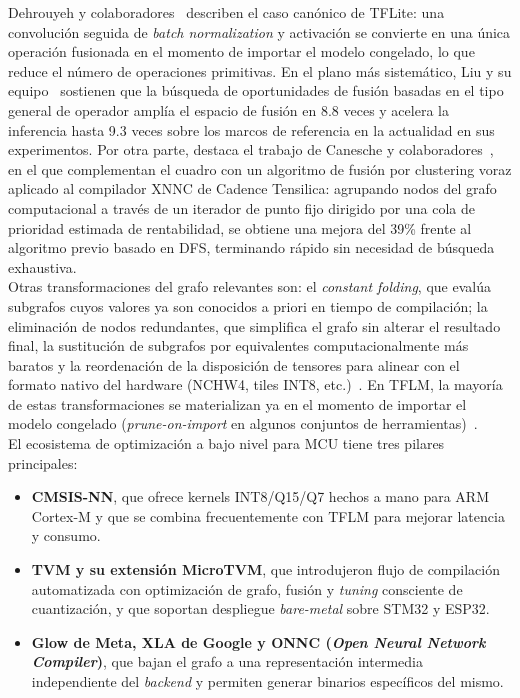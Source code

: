 \documentclass[a4paper,12pt,twoside,final]{book}
\begin{document}
Dehrouyeh y colaboradores~\cite{dehrouyeh2024ieeeaccess} describen el caso canónico de TFLite: una convolución
seguida de \textit{batch normalization} y activación se convierte en una única operación fusionada en el momento de
importar el modelo congelado, lo que reduce el número de operaciones primitivas. En el plano más sistemático,
Liu y su equipo~\cite{liu2023ieecomst} sostienen que la búsqueda de oportunidades de fusión basadas en el
tipo general de operador amplía el espacio de fusión en 8.8 veces y acelera la inferencia hasta 9.3 veces sobre los
marcos de referencia en la actualidad en sus experimentos. Por otra parte, destaca el trabajo de Canesche y
colaboradores~\cite{canesche2021acm}, en el que complementan el cuadro con un algoritmo de fusión por clustering
voraz aplicado al compilador XNNC de Cadence Tensilica: agrupando nodos del grafo computacional a través de un
iterador de punto fijo dirigido por una cola de prioridad estimada de rentabilidad, se obtiene una mejora del 39\%
frente al algoritmo previo basado en DFS, terminando rápido sin necesidad de búsqueda exhaustiva.\\

Otras transformaciones del grafo relevantes son: el \textit{constant folding}, que evalúa subgrafos cuyos valores ya
son conocidos a priori en tiempo de compilación; la eliminación de nodos redundantes, que simplifica el grafo sin
alterar el resultado final, la sustitución de subgrafos por equivalentes computacionalmente más baratos y la
reordenación de la disposición de tensores para alinear con el formato nativo del hardware
(NCHW4, tiles INT8, etc.)~\cite{somvanshi2025acm,zheng2025diffusion}. En TFLM, la mayoría de estas transformaciones
se materializan ya en el momento de importar el modelo congelado (\textit{prune-on-import} en algunos conjuntos de
herramientas)~\cite{somvanshi2025acm,dehrouyeh2024ieeeaccess}.\\

El ecosistema de optimización a bajo nivel para MCU tiene tres pilares principales:
\begin{itemize}
  \item \textbf{CMSIS-NN}, que ofrece kernels INT8/Q15/Q7 hechos a mano para ARM Cortex-M y que se combina
  frecuentemente con TFLM para mejorar latencia y consumo.
  \item \textbf{TVM y su extensión MicroTVM}, que introdujeron flujo de compilación automatizada con optimización de
  grafo, fusión y \textit{tuning} consciente de cuantización, y que soportan despliegue \textit{bare-metal} sobre STM32
  y ESP32.
  \item \textbf{Glow de Meta, XLA de Google y ONNC (\textit{Open Neural Network Compiler})}, que bajan el grafo a una
  representación intermedia independiente del \textit{backend} y permiten generar binarios específicos del
  mismo.
\end{itemize}
\end{document}
